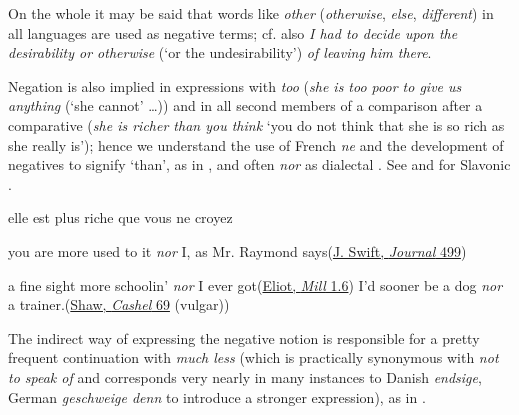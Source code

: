 On the whole it may be said that words like \textit{other} (\textit{otherwise}, \textit{else}, \textit{different}) in all languages are used as negative terms; cf. also \textit{I had to decide upon the desirability or otherwise} (`or the undesirability') \textit{of leaving him there}.

Negation is also implied in expressions with \textit{too} (\textit{she is too poor to give us anything} (`she cannot' {\dots})) and in all second members of a comparison after a comparative (\textit{she is richer than you think} `you do not think that she is so rich as she really is'); %
hence we understand the use of French \textit{ne}  and the development of negatives to signify `than', as in , and often \textit{nor} as dialectal . See \citet[\href{https://archive.org/details/indogermanischef32berluoft/page/338/mode/2up}{339}]{holthausen1913negation} 
and for Slavonic \citet[\href{https://archive.org/details/vergleichendesl00vondgoog/page/335/mode/2up?view=theater}{336}]{vondrak1908vergleichende}. 

\ea \label{ex:04-242}
elle est plus riche que vous ne croyez
\z

\ea \label{ex:04-243}
you are more used to it \textit{nor} I, as Mr. Raymond says\hfill(\href{https://archive.org/details/journaltostellae00swifuoft/page/498/mode/2up?q=\%22are+more+used+to+it\%22&view=theater}{J. Swift, \textit{Journal} 499}) %
\z

\ea \label{ex:04-244}
\ea
a fine sight more schoolin' \textit{nor} I ever got\hfill(\href{https://archive.org/details/millonfloss0009geor/page/4/mode/2up?q=\%22fine+sight+more+schoolin%27\%22&view=theater}{Eliot, \textit{Mill} 1.6}) %
\ex
I'd sooner be a dog \textit{nor} a trainer.\hfill(\href{https://archive.org/details/cashelbyronsprof00shawuoft/page/n95/mode/2up?q=\%22sooner+be+a+dog\%22&view=theater}{Shaw, \textit{Cashel} 69} (vulgar)) 
\z\z


The indirect way of expressing the negative notion is responsible for a pretty frequent continuation with \textit{much less} (which is practically synonymous with \textit{not to speak of} and corresponds very nearly in many instances to Danish \textit{endsige}, German \textit{geschweige denn} to introduce a stronger expression), as in .\largerpage[2]

